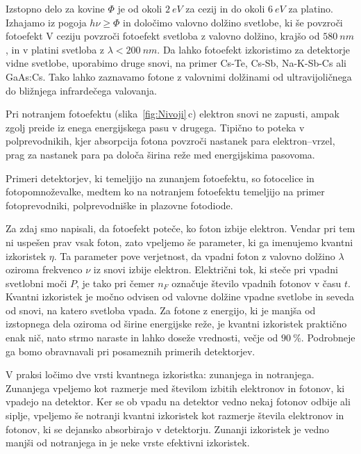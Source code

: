 Izstopno delo za kovine $\Phi$ je od okoli $2~\si{eV}$ za cezij in do okoli 
$6~\si{eV}$ za platino. Izhajamo iz pogoja $h \nu \geq \Phi$ in določimo 
valovno dolžino svetlobe, ki še povzroči fotoefekt
V ceziju povzroči fotoefekt svetloba z valovno dolžino, krajšo od $580~\si{nm}$, in
v platini svetloba z $\lambda < 200~\si{nm}$. 
Da lahko fotoefekt izkoristimo za detektorje vidne svetlobe, 
uporabimo druge snovi, na primer Cs-Te, Cs-Sb, Na-K-Sb-Cs ali GaAs:Cs. 
Tako lahko zaznavamo fotone z valovnimi dolžinami od ultravijoličnega
do bližnjega infrardečega valovanja.

Pri notranjem fotoefektu (slika~\ref{fig:Nivoji}\,c) elektron 
snovi ne zapusti, ampak zgolj preide iz enega 
energijskega pasu v drugega. Tipično to poteka v polprevodnikih, kjer absorpcija fotona 
povzroči nastanek para elektron--vrzel, prag za nastanek para pa določa širina reže med 
energijskima pasovoma. 

Primeri detektorjev, ki temeljijo na zunanjem fotoefektu, so 
fotocelice in foto\-pomnoževalke, medtem ko na notranjem fotoefektu temeljijo na primer
fotoprevodniki, polprevodniške in plazovne fotodiode.

Za zdaj smo napisali, da fotoefekt poteče, ko foton izbije elektron. Vendar pri tem ni 
uspešen prav vsak foton, zato vpeljemo še parameter, ki ga imenujemo 
kvantni izkoristek $\eta$.
Ta parameter pove verjetnost, da vpadni foton z valovno dolžino $\lambda$ 
oziroma frekvenco $\nu$ iz snovi izbije elektron. 
Električni tok, ki steče pri vpadni svetlobni moči $P$, je tako
pri čemer $n_F$ označuje število vpadnih fotonov v času $t$. 
Kvantni izkoristek je močno odvisen od valovne dolžine vpadne svetlobe in seveda
od snovi, na katero svetloba vpada. Za fotone z energijo, ki je manjša od izstopnega 
dela oziroma od širine energijske reže, je kvantni izkoristek praktično enak nič, 
nato strmo naraste in lahko doseže vrednosti, večje od $90~\%$. Podrobneje ga bomo 
obravnavali pri posameznih primerih detektorjev.

\begin{remark}
V praksi ločimo dve vrsti kvantnega izkoristka: zunanjega in notranjega. Zunanjega vpeljemo kot 
razmerje med številom izbitih elektronov in fotonov, ki vpadejo na detektor. Ker se 
ob vpadu na detektor vedno nekaj fotonov odbije ali siplje, vpeljemo še notranji kvantni 
izkoristek kot razmerje števila elektronov in fotonov, ki se dejansko absorbirajo v detektorju.
Zunanji izkoristek je vedno manjši od notranjega in je neke vrste efektivni 
izkoristek.
\end{remark}

